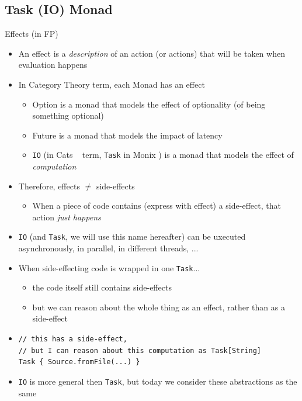 \documentclass[presentation, 9pt]{beamer}\mode<presentation>{\usetheme{AMSBolognaFC}}
\begin{document}
\subsection{Task (IO) Monad}
\begin{frame}[fragile]{Effects (in FP)}
	\begin{itemize}
		\item An effect is a \emph{description} of an action (or actions) that will be taken when evaluation happens
		\item In Category Theory term, each Monad has an effect
		\begin{itemize}
			\item Option is a monad that models the effect of optionality (of being something optional)
   		\item Future is a monad that models the impact of latency
     	\item \texttt{IO} (in Cats ~\href{https://typelevel.org/cats/}{\faLink} term, \texttt{Task} in Monix \href{https://monix.io/}{\faLink}) is a monad that models the effect of \emph{computation}
		\end{itemize}
		\item Therefore, effects $\neq$ side-effects
		\begin{itemize}
			\item When a piece of code contains (express with effect) a side-effect, that action \emph{just happens}
		\end{itemize}
		\item \texttt{IO} (and \texttt{Task}, we will use this name hereafter) can be uxecuted asynchronously, in parallel, in different threads, ...
  	\item {} When side-effecting code is wrapped in one \texttt{Task}...
		\begin{itemize}
			 \item the code itself still contains side-effects 
			 \item but we can reason about the whole thing as an effect, rather than as a side-effect
    \end{itemize}
		\item[] 	\begin{tcolorbox}[left=0pt, top=0pt, bottom=0pt]
			\begin{verbatim}
// this has a side-effect, 
// but I can reason about this computation as Task[String]
Task { Source.fromFile(...) } 
			\end{verbatim}
		\end{tcolorbox}
		\item {} \texttt{IO} is more general then \texttt{Task}, but today we consider these abstractions as the same
	\end{itemize}
\end{frame}
\end{document}
